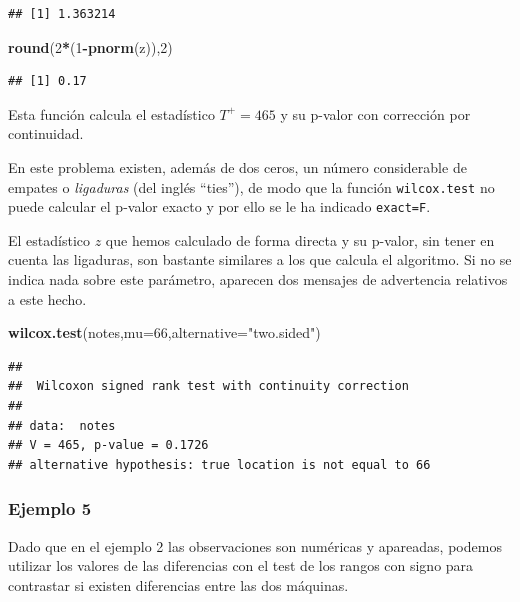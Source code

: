 \documentclass[
]{article}
\newenvironment{Shaded}{\begin{snugshade}}{\end{snugshade}}
\newcommand{\AttributeTok}[1]{\textcolor[rgb]{0.13,0.29,0.53}{#1}}
\newcommand{\DecValTok}[1]{\textcolor[rgb]{0.00,0.00,0.81}{#1}}
\newcommand{\FunctionTok}[1]{\textcolor[rgb]{0.13,0.29,0.53}{\textbf{#1}}}
\newcommand{\NormalTok}[1]{#1}
\newcommand{\SpecialCharTok}[1]{\textcolor[rgb]{0.81,0.36,0.00}{\textbf{#1}}}
\newcommand{\StringTok}[1]{\textcolor[rgb]{0.31,0.60,0.02}{#1}}
\begin{document}
\begin{verbatim}
## [1] 1.363214
\end{verbatim}

\begin{Shaded}
\begin{Highlighting}[]
\FunctionTok{round}\NormalTok{(}\DecValTok{2}\SpecialCharTok{*}\NormalTok{(}\DecValTok{1}\SpecialCharTok{{-}}\FunctionTok{pnorm}\NormalTok{(z)),}\DecValTok{2}\NormalTok{)}
\end{Highlighting}
\end{Shaded}

\begin{verbatim}
## [1] 0.17
\end{verbatim}

Esta función calcula el estadístico \(T^{+}=465\) y su p-valor con corrección por continuidad.

En este problema existen, además de dos ceros, un número considerable de empates o \emph{ligaduras} (del inglés ``ties''), de modo que la función \texttt{wilcox.test} no puede calcular el p-valor exacto y por ello se le ha indicado \texttt{exact=F}.

El estadístico \(z\) que hemos calculado de forma directa y su p-valor, sin tener en cuenta las ligaduras, son bastante similares a los que calcula el algoritmo. Si no se indica nada sobre este parámetro, aparecen dos mensajes de advertencia relativos a este hecho.

\begin{Shaded}
\begin{Highlighting}[]
\FunctionTok{wilcox.test}\NormalTok{(notes,}\AttributeTok{mu=}\DecValTok{66}\NormalTok{,}\AttributeTok{alternative=}\StringTok{"two.sided"}\NormalTok{)}
\end{Highlighting}
\end{Shaded}

\begin{verbatim}
## 
##  Wilcoxon signed rank test with continuity correction
## 
## data:  notes
## V = 465, p-value = 0.1726
## alternative hypothesis: true location is not equal to 66
\end{verbatim}

\subsubsection{Ejemplo 5}\label{ejemplo-5-1}

Dado que en el ejemplo 2 las observaciones son numéricas y apareadas, podemos utilizar los valores de las diferencias con el test de los rangos con signo para contrastar si existen diferencias entre las dos máquinas.
\end{document}
